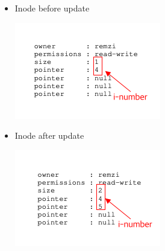 \documentclass[12pt]{article}
\begin{document}
\begin{itemize}
    \item Inode before update

    \begin{center}
    \includegraphics[width=0.6\linewidth]{../images/midterm_4_solution_26.png}
    \end{center}

    \item Inode after update

    \begin{center}
    \includegraphics[width=0.6\linewidth]{../images/midterm_4_solution_27.png}
    \end{center}










\end{itemize}
\end{document}
